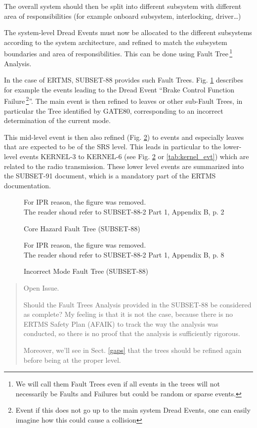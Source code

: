 \documentclass{template/openetcs_article}
\newenvironment{issue}{
	\begin{quote}
	\begin{itshape}Open Issue. 
}{
	\end{itshape}
	\end{quote}
}
\begin{document}
The overall system should then be split into different subsystem with different area of responsibilities
(for example onboard subsystem, interlocking, driver\dots)

The system-level Dread Events must now be allocated to the different subsystems according to the system
architecture, and refined to 
match the subsystem boundaries and area of responsibilities. This can be done using 
Fault Tree\,\footnote{We will call them Fault Trees even if all events in the trees will not necessarily
be Faults and Failures but could be random or sparse events.} Analysis.

In the case of ERTMS, SUBSET-88 provides such Fault Trees. Fig. \ref{fig:ch_fault_tree} describes for
example the events leading to the Dread Event ``Brake Control Function Failure\,\footnote{Event
if this does not go up to the main system Dread Events, one can easily imagine how this 
could cause a collision}''. The main event is then refined to leaves or other sub-Fault Trees, 
in particular the Tree identified by GATE80, corresponding to an incorrect determination of the 
current mode. 

This mid-level event is then also refined (Fig. \ref{fig:mode_fault_tree}) to events and especially 
leaves that are expected to be of the SRS level. This leads in particular to the lower-level events
KERNEL-3 to KERNEL-6 (see Fig. \ref{fig:mode_fault_tree} or \ref{tab:kernel_evt}) which are related 
to the radio transmission. These lower level events are 
summarized into the SUBSET-91 document, which is a mandatory part of the ERTMS documentation.

\begin{figure}
  \centering
  {For IPR reason, the figure was removed. \\
  The reader shoud refer to SUBSET-88-2 Part 1, Appendix B, p. 2}
  \caption{Core Hazard Fault Tree (SUBSET-88)}
  \label{fig:ch_fault_tree}
\end{figure}

\begin{figure}
  \centering
  {For IPR reason, the figure was removed. \\
  The reader shoud refer to SUBSET-88-2 Part 1, Appendix B, p. 8}
  \caption{Incorrect Mode Fault Tree (SUBSET-88)}
  \label{fig:mode_fault_tree}
\end{figure}

\begin{issue}
Should the Fault Trees Analysis provided in the SUBSET-88 be considered as complete? My feeling is 
that it is not the case, because there is no ERTMS Safety Plan (AFAIK) to track the way the analysis 
was conducted, so there is no proof that the analysis is sufficiently rigorous.

Moreover, we'll see in Sect. \ref{gaps} that the trees should be refined again before being at the proper
level.
\end{issue}
\end{document}
